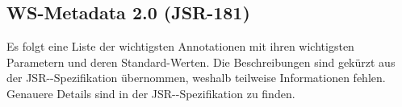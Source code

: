 \documentclass[runningheads]{llncs}
\begin{document}
  \label{jsr181}
  \subsection{WS-Metadata 2.0 (JSR-181)}
  \nocite{jsr_181}

    Es folgt eine Liste der wichtigsten Annotationen mit ihren wichtigsten Parametern und deren Standard-Werten. Die Beschreibungen sind gekürzt aus der JSR--\linebreak[0]Spezifikation\cite{jsr_181} übernommen, weshalb teilweise Informationen fehlen. Genauere Details sind in der JSR--\linebreak[0]Spezifikation\cite{jsr_181} zu finden.\\ \vfill
\end{document}
